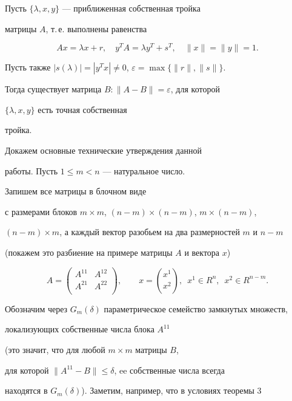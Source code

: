 \begin{thm}


Пусть $\{\lambda, x, y\}$ --- приближенная собственная тройка


матрицы $A$, т.\,е. выполнены равенства


$$


Ax=\lambda x+r,\quad y^T A=\lambda y^T+s^T,\quad \|x\|=\|y\|=1.


$$


Пусть также $|s(\lambda)|=|y^T x|\ne 0$, $\varepsilon=\max\{\|r\|,\|s\|\}$.


Тогда существует матрица $B:\|A-B\|= \varepsilon$, для которой


$\{\lambda, x, y\}$ есть точная собственная


тройка.


\end{thm}





Докажем основные технические утверждения данной


работы. Пусть $1\le m < n$ --- натуральное число.


Запишем все матрицы в блочном виде


с размерами блоков $m\times m$, $(n-m)\times (n-m)$, $m\times (n-m)$,


$(n-m)\times m$, а каждый вектор разобьем на два размерностей $m$ и $n-m$


(покажем это разбиение на примере матрицы $A$ и вектора $x$)


$$


A=\begin{pmatrix}


A^{11}&A^{12}\\


A^{21}&A^{22}\\


\end{pmatrix},\qquad


x=\binom{x^1}{x^2},\ \; x^1\in R^n,\ \; x^2\in R^{n-m}.


$$


Обозначим через $G_m(\delta)$ параметрическое семейство замкнутых множеств,


локализующих собственные числа блока $A^{11}$


(это значит, что для любой $m\times m$ матрицы $B$, 


для которой $\|A^{11}-B\|\le \delta$, ee собственные числа всегда


находятся в $G_m(\delta)$). Заметим, например, что в условиях теоремы 3


